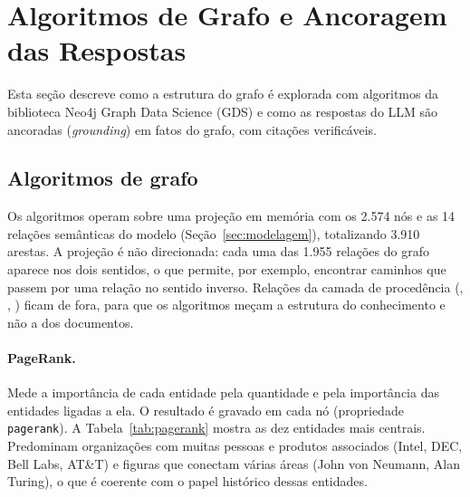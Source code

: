 %

\section{Algoritmos de Grafo e Ancoragem das Respostas}
\label{sec:grounding}

Esta seção descreve como a estrutura do grafo é explorada com algoritmos da biblioteca Neo4j Graph Data Science (GDS) e como as respostas do LLM são ancoradas (\emph{grounding}) em fatos do grafo, com citações verificáveis.

\subsection{Algoritmos de grafo}

Os algoritmos operam sobre uma projeção em memória com os 2.574 nós  e as 14 relações semânticas do modelo (Seção~\ref{sec:modelagem}), totalizando 3.910 arestas. A projeção é não direcionada: cada uma das 1.955 relações do grafo aparece nos dois sentidos, o que permite, por exemplo, encontrar caminhos que passem por uma relação  no sentido inverso. Relações da camada de procedência (, , ) ficam de fora, para que os algoritmos meçam a estrutura do conhecimento e não a dos documentos.

\paragraph{PageRank.} Mede a importância de cada entidade pela quantidade e pela importância das entidades ligadas a ela. O resultado é gravado em cada nó (propriedade \texttt{pagerank}). A Tabela~\ref{tab:pagerank} mostra as dez entidades mais centrais. Predominam organizações com muitas pessoas e produtos associados (Intel, DEC, Bell Labs, AT\&T) e figuras que conectam várias áreas (John von Neumann, Alan Turing), o que é coerente com o papel histórico dessas entidades.

